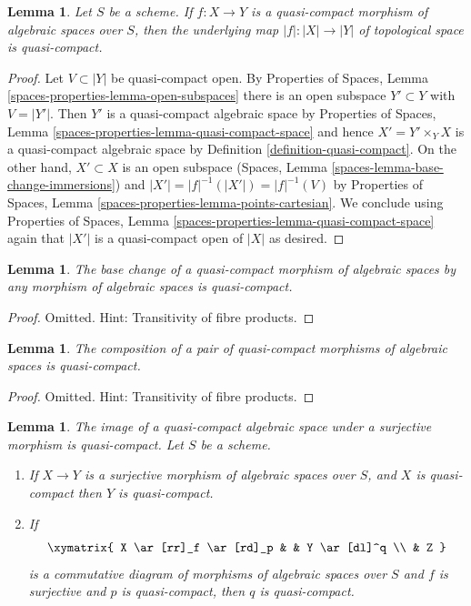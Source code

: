 \documentclass{stacks-project}
\newenvironment{slogan}{\comment}{\endcomment}
\theoremstyle{plain}
\newtheorem{lemma}[subsection]{Lemma}
\theoremstyle{definition}
\theoremstyle{remark}
\numberwithin{equation}{subsection}
\begin{document}
\begin{lemma}
\label{lemma-quasi-compact-is-quasi-compact}
Let $S$ be a scheme. If $f : X \to Y$ is a quasi-compact morphism of
algebraic spaces over $S$, then the underlying map
$|f| : |X| \to |Y|$ of topological space is quasi-compact.
\end{lemma}

\begin{proof}
Let $V \subset |Y|$ be quasi-compact open. By Properties of Spaces,
Lemma \ref{spaces-properties-lemma-open-subspaces}
there is an open subspace $Y' \subset Y$ with $V = |Y'|$.
Then $Y'$ is a quasi-compact algebraic space by
Properties of Spaces, Lemma \ref{spaces-properties-lemma-quasi-compact-space}
and hence $X' = Y' \times_Y X$ is a quasi-compact algebraic
space by Definition \ref{definition-quasi-compact}.
On the other hand, $X' \subset X$ is an open subspace
(Spaces, Lemma \ref{spaces-lemma-base-change-immersions})
and $|X'| = |f|^{-1}(|X'|) = |f|^{-1}(V)$ by
Properties of Spaces, Lemma \ref{spaces-properties-lemma-points-cartesian}.
We conclude using
Properties of Spaces, Lemma \ref{spaces-properties-lemma-quasi-compact-space}
again that $|X'|$ is a quasi-compact open of $|X|$ as desired.
\end{proof}

\begin{lemma}
\label{lemma-base-change-quasi-compact}
The base change of a quasi-compact morphism of algebraic spaces
by any morphism of algebraic spaces is quasi-compact.
\end{lemma}

\begin{proof}
Omitted. Hint: Transitivity of fibre products.
\end{proof}

\begin{lemma}
\label{lemma-composition-quasi-compact}
The composition of a pair of quasi-compact morphisms of algebraic spaces
is quasi-compact.
\end{lemma}

\begin{proof}
Omitted. Hint: Transitivity of fibre products.
\end{proof}

\begin{lemma}
\label{lemma-surjection-from-quasi-compact}
\begin{slogan}
The image of a quasi-compact algebraic space under a surjective morphism
is quasi-compact.
\end{slogan}
Let $S$ be a scheme.
\begin{enumerate}
\item If $X \to Y$ is a surjective morphism of algebraic spaces over $S$,
and $X$ is quasi-compact then $Y$ is quasi-compact.
\item If
$$
\xymatrix{
X \ar[rr]_f \ar[rd]_p & &
Y \ar[dl]^q \\
& Z
}
$$
is a commutative diagram of morphisms of algebraic spaces over $S$
and $f$ is surjective and $p$ is quasi-compact, then $q$ is quasi-compact.
\end{enumerate}
\end{lemma}
\end{document}
